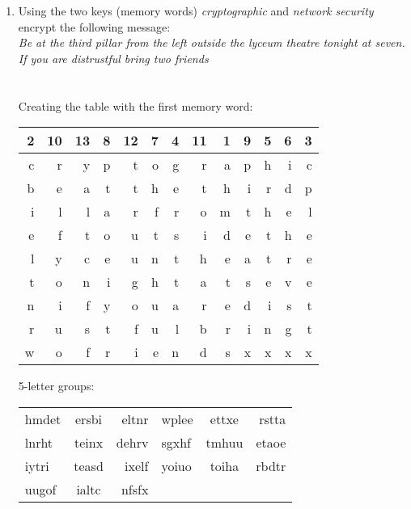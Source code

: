\documentclass[12pt]{article}
\begin{document}
\begin{enumerate}
	\begin{enumerate}
		\item{ Using the two keys (memory words) \textit{cryptographic} and \textit{network security} encrypt the following message:} \\
		
		\textit{Be at the third pillar from the left outside the lyceum theatre tonight at seven. If you are distrustful bring two friends}\\\\\\
		Creating the table with the first memory word: \\
		
\begin{center}
  \begin{tabular}{ | r | r | r | r | r | r | r | r | r | r | r | r | r |}
    \hline
   \rowcolor{lightgray}  2 & 10 & 13 & 8 & 12 & 7 & 4 & 11 & 1 & 9 & 5 & 6 & 3\\ \hline
    \rowcolor{maroon!10}c & r & y & p & t & o & g & r & a & p & h & i & c\\ \hline
    b&e&a&t&t&h&e&t&h&i&r&d&p\\ \hline
    i&l&l&a&r&f&r&o&m&t&h&e&l\\ \hline
    e&f&t&o&u&t&s&i&d&e&t&h&e\\ \hline
    l&y&c&e&u&n&t&h&e&a&t&r&e \\ \hline
    t&o&n&i&g&h&t&a&t&s&e&v&e\\ \hline
    n&i&f&y&o&u&a&r&e&d&i&s&t\\ \hline
    r&u&s&t&f&u&l&b&r&i&n&g&t\\ \hline
    w&o&f&r&i&e&n&d&s&x&x&x&x\\ \hline
    \hline 
  \end{tabular}
\end{center}
5-letter groups:\\

\begin{tabular}{ l c r l c r }
  hmdet & ersbi & eltnr & wplee & ettxe & rstta \\
  lnrht & teinx & dehrv & sgxhf & tmhuu & etaoe \\
  iytri & teasd & ixelf & yoiuo & toiha & rbdtr \\
  uugof & ialtc & nfsfx 
\end{tabular} \\\\\\\\\\


\end{enumerate}
\end{enumerate}
\end{document}
